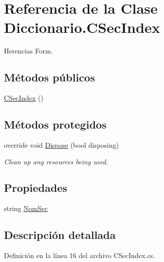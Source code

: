 \hypertarget{class_diccionario_1_1_c_sec_index}{\section{Referencia de la Clase Diccionario.\-C\-Sec\-Index}
\label{class_diccionario_1_1_c_sec_index}
}


Herencias Form.

\subsection*{Métodos públicos}
\begin{DoxyCompactItemize}
\item 
\hyperlink{class_diccionario_1_1_c_sec_index_afcd88c4a274b814cb627f62c2caad42b}{C\-Sec\-Index} ()
\end{DoxyCompactItemize}
\subsection*{Métodos protegidos}
\begin{DoxyCompactItemize}
\item 
override void \hyperlink{class_diccionario_1_1_c_sec_index_a0a3e910af888990b8f4102db4173b9e1}{Dispose} (bool disposing)
\begin{DoxyCompactList}\small\item\em Clean up any resources being used. \end{DoxyCompactList}\end{DoxyCompactItemize}
\subsection*{Propiedades}
\begin{DoxyCompactItemize}
\item 
string \hyperlink{class_diccionario_1_1_c_sec_index_a709ba4feff6de5534dcd4345868e2301}{Nom\-Sec}
\end{DoxyCompactItemize}


\subsection{Descripción detallada}


Definición en la línea 16 del archivo C\-Sec\-Index.\-cs.



